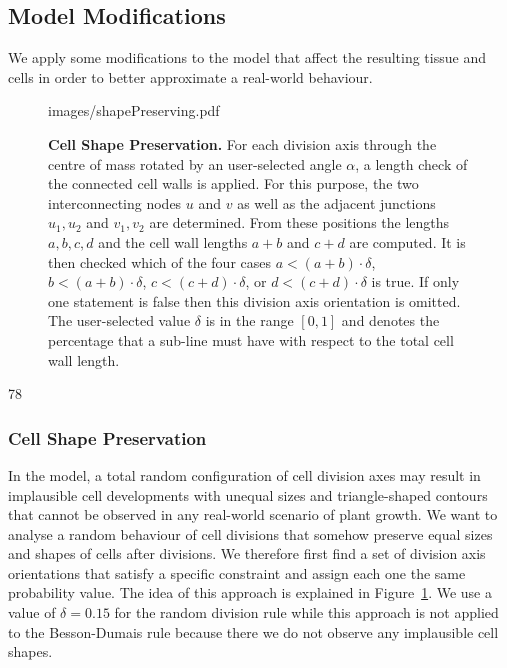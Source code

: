 \documentclass[11pt,a4paper, final]{article}
\begin{document}
\subsection{Model Modifications}
We apply some modifications to the model that affect the resulting tissue and cells in order to better approximate a real-world behaviour.
%
\begin{figure}[htbp]
	\begin{center}
		\begin{overpic}[width=0.7\linewidth]{images/shapePreserving.pdf}
		\end{overpic}
\caption[]
{
{\bf Cell Shape Preservation.} For each division axis through the centre of mass rotated by an user-selected angle $\alpha$, a length check of the connected cell walls is applied. For this purpose, the two interconnecting nodes $u$ and $v$ as well as the adjacent junctions $u_1, u_2$ and $v_1, v_2$ are determined. From these positions the lengths $a, b, c, d$ and the cell wall lengths $a+b$ and $c+d$ are computed. It is then checked which of the four cases $a < (a+b)\cdot \delta$, $b < (a+b)\cdot \delta$, $c < (c+d)\cdot \delta$, or $d < (c+d)\cdot \delta$ is true. If only one statement is false then this division axis orientation is omitted. The user-selected value $\delta$ is in the range $[0,1]$ and denotes the percentage that a sub-line must have with respect to the total cell wall length.
}
	\label{fig:shapePreserving}
	\end{center}
\end{figure}
%
78
\subsubsection{Cell Shape Preservation}
\label{sec:cellShape}
\noindent
In the model, a total random configuration of cell division axes may result in implausible cell developments with unequal sizes and triangle-shaped contours that cannot be observed in any real-world scenario of plant growth. We want to analyse a random behaviour of cell divisions that somehow preserve equal sizes and shapes of cells after divisions. We therefore first find a set of division axis orientations that satisfy a specific constraint and assign each one the same probability value. The idea of this approach is explained in Figure~\ref{fig:shapePreserving}. We use a value of $\delta = 0.15$ for the random division rule while this approach is not applied to the Besson-Dumais rule because there we do not observe any implausible cell shapes.
\end{document}
